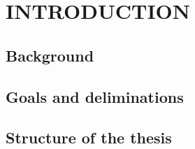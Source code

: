 \section{INTRODUCTION}


\subsection{Background}


\subsection{Goals and deliminations}


\subsection{Structure of the thesis}

